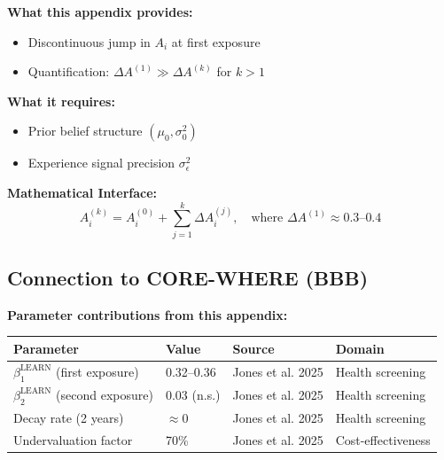 \begin{tcolorbox}[colback=yellow!5!white, colframe=yellow!75!black,
    title=Integration: PREDICT-HABIT $\leftrightarrow$ CORE-AWARE]
\textbf{What this appendix provides:}
\begin{itemize}[nosep]
\item Discontinuous jump in $A_i$ at first exposure
\item Quantification: $\Delta A^{(1)} \gg \Delta A^{(k)}$ for $k > 1$
\end{itemize}

\textbf{What it requires:}
\begin{itemize}[nosep]
\item Prior belief structure $(\mu_0, \sigma^2_0)$
\item Experience signal precision $\sigma^2_\epsilon$
\end{itemize}

\textbf{Mathematical Interface:}
\begin{equation}
A^{(k)}_i = A^{(0)}_i + \sum_{j=1}^{k} \Delta A^{(j)}_i, \quad \text{where } \Delta A^{(1)} \approx 0.3\text{--}0.4
\end{equation}
\end{tcolorbox}

\subsection{Connection to CORE-WHERE (BBB)}

\begin{tcolorbox}[colback=yellow!5!white, colframe=yellow!75!black,
    title=Integration: PREDICT-HABIT $\leftrightarrow$ CORE-WHERE]
\textbf{Parameter contributions from this appendix:}

\begin{table}[H]
\centering
\begin{tabular}{@{}llll@{}}
\toprule
\textbf{Parameter} & \textbf{Value} & \textbf{Source} & \textbf{Domain} \\
\midrule
$\beta^{\text{LEARN}}_1$ (first exposure) & 0.32--0.36 & Jones et al. 2025 & Health screening \\
$\beta^{\text{LEARN}}_2$ (second exposure) & 0.03 (n.s.) & Jones et al. 2025 & Health screening \\
Decay rate (2 years) & $\approx 0$ & Jones et al. 2025 & Health screening \\
Undervaluation factor & 70\% & Jones et al. 2025 & Cost-effectiveness \\
\bottomrule
\end{tabular}
\end{table}
\end{tcolorbox}


